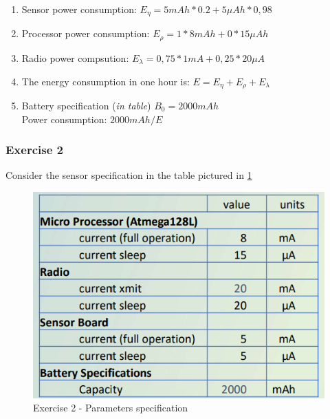 \begin{enumerate}
	\item Sensor power consumption:
	$E_{\eta} = 5 mAh * 0.2+ 5 \mu Ah *0,98$
	\item Processor power consumption:
	$E_{\rho}=1*8 mAh + 0*15 \mu Ah $
	\item Radio power compsution:
	$E_{\lambda}=0,75*1 mA + 0,25*20 \mu A$
	\item The energy consumption in one hour is:
	$E = E_{\eta} + E_{\rho} + E_{\lambda}$
	\item Battery specification (\textit{in table}) $B_{0} = 2000mAh$\\
	Power consumption: $2000 mAh / E$     \\
\end{enumerate}



\subsubsection{Exercise 2}\label{sec:exercise-2}
Consider the sensor specification in the table pictured in \ref{chenergy-ex2}
\begin{figure}[h]
	\centering\includegraphics[scale=0.50]{images/Pasted image 20230328161140.png}
	\caption{Exercise 2 - Parameters specification}
	\label{chenergy-ex2}
\end{figure}


